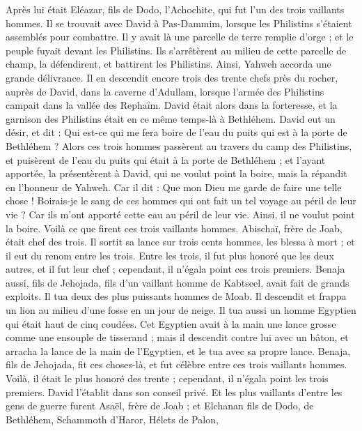 \begin{multicols}{2}
Après lui était Eléazar, fils de Dodo, l'Achochite, qui fut l'un des trois vaillants hommes.
Il se trouvait avec David à Pas-Dammim, lorsque les Philistins s'étaient assemblés pour combattre. Il y avait là une parcelle de terre remplie d'orge ; et le peuple fuyait devant les Philistins.
Ils s'arrêtèrent au milieu de cette parcelle de champ, la défendirent, et battirent les Philistins. Ainsi, Yahweh accorda une grande délivrance.
Il en descendit encore trois des trente chefs près du rocher, auprès de David, dans la caverne d'Adullam, lorsque l'armée des Philistins campait dans la vallée des Rephaïm.
David était alors dans la forteresse, et la garnison des Philistins était en ce même temps-là à Bethléhem.
David eut un désir, et dit : Qui est-ce qui me fera boire de l'eau du puits qui est à la porte de Bethléhem ?
Alors ces trois hommes passèrent au travers du camp des Philistins, et puisèrent de l'eau du puits qui était à la porte de Bethléhem ; et l'ayant apportée, la présentèrent à David, qui ne voulut point la boire, mais la répandit en l'honneur de Yahweh.
Car il dit : Que mon Dieu me garde de faire une telle chose ! Boirais-je le sang de ces hommes qui ont fait un tel voyage au péril de leur vie ? Car ils m'ont apporté cette eau au péril de leur vie. Ainsi, il ne voulut point la boire. Voilà ce que firent ces trois vaillants hommes.
Abischaï, frère de Joab, était chef des trois. Il sortit sa lance sur trois cents hommes, les blessa à mort ; et il eut du renom entre les trois.
Entre les trois, il fut plus honoré que les deux autres, et il fut leur chef ; cependant, il n'égala point ces trois premiers.
Benaja aussi, fils de Jehojada, fils d'un vaillant homme de Kabtseel, avait fait de grands exploits. Il tua deux des plus puissants hommes de Moab. Il descendit et frappa un lion au milieu d'une fosse en un jour de neige.
Il tua aussi un homme Egyptien qui était haut de cinq coudées. Cet Egyptien avait à la main une lance grosse comme une ensouple de tisserand ; mais il descendit contre lui avec un bâton, et arracha la lance de la main de l'Egyptien, et le tua avec sa propre lance.
Benaja, fils de Jehojada, fit ces choses-là, et fut célèbre entre ces trois vaillants hommes.
Voilà, il était le plus honoré des trente ; cependant, il n'égala point les trois premiers. David l'établit dans son conseil privé.
Et les plus vaillants d'entre les gens de guerre furent Asaël, frère de Joab ; et Elchanan fils de Dodo, de Bethléhem,
Schammoth d'Haror, Hélets de Palon,

\end{multicols}

